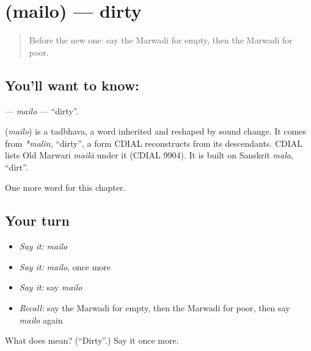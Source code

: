 \section[\texorpdfstring{\mw{मैलो} (mailo)}{मैलो (mailo)}]{ (mailo) — dirty}

\label{lesson:MW-C75-mailo}



\begin{quote}
Before the new one: say the Marwadi for empty, then the Marwadi for poor.
\end{quote}

\subsection*{You'll want to know: }
\textbf{} — \emph{mailo} — \textquotedblleft{}dirty\textquotedblright{}.

\begin{cousinweb}
\textbf{} (\emph{mailo}) is a tadbhava, a word inherited and reshaped by sound change. It comes from \emph{*malin}, \textquotedblleft{}dirty\textquotedblright{}, a form CDIAL reconstructs from its descendants. CDIAL lists Old Marwari \emph{mailā} under it (CDIAL 9904). It is built on Sanskrit \emph{mala}, \textquotedblleft{}dirt\textquotedblright{}.
\end{cousinweb}

\begin{grammarlens}[title={What you've built}]
One more word for this chapter.
\end{grammarlens}

\subsection*{Your turn}
\begin{itemize}
\raggedright
  \item \emph{Say it:} \emph{mailo}
  \item \emph{Say it:} \emph{mailo}, once more
  \item \emph{Say it:} say \emph{mailo}
  \item \emph{Recall:} say the Marwadi for empty, then the Marwadi for poor, then say \emph{mailo} again
\end{itemize}

\begin{tcolorbox}[breakable,colback=teal!4,colframe=teal!35!black,title={Before you move on}]
What does  mean? (\textquotedblleft{}Dirty\textquotedblright{}.) Say it once more.
\end{tcolorbox}

